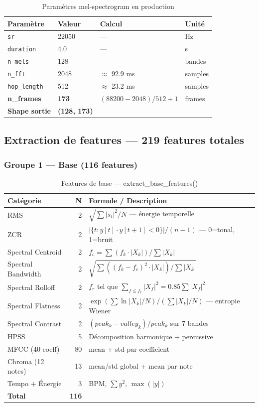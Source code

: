 \documentclass[11pt,a4paper]{article}
\newcommand{\code}[1]{\texttt{\small #1}}
\begin{document}
\begin{table}[htbp]
\centering
\begin{tabular}{@{}llll@{}}
\toprule
\textbf{Paramètre} & \textbf{Valeur} & \textbf{Calcul} & \textbf{Unité} \\
\midrule
\code{sr} & 22050 & — & Hz \\
\code{duration} & 4.0 & — & s \\
\code{n\_mels} & 128 & — & bandes \\
\code{n\_fft} & 2048 & $\approx$ 92.9 ms & samples \\
\code{hop\_length} & 512 & $\approx$ 23.2 ms & samples \\
\textbf{n\_frames} & \textbf{173} & $(88200 - 2048) / 512 + 1$ & frames \\
\textbf{Shape sortie} & \textbf{(128, 173)} & & \\
\bottomrule
\end{tabular}
\caption{Paramètres mel-spectrogram en production}
\end{table}

\subsection{Extraction de features — 219 features totales}

\subsubsection{Groupe 1 — Base (116 features)}

\begin{table}[htbp]
\centering
\begin{tabular}{@{}lrp{8cm}@{}}
\toprule
\textbf{Catégorie} & \textbf{N} & \textbf{Formule / Description} \\
\midrule
RMS & 2 & $\sqrt{\sum|s_t|^2 / N}$ — énergie temporelle \\
ZCR & 2 & $|\{t : y[t] \cdot y[t{+}1] < 0\}| / (n-1)$ — 0=tonal, 1=bruit \\
Spectral Centroid & 2 & $f_c = \sum(f_k \cdot |X_k|) / \sum|X_k|$ \\
Spectral Bandwidth & 2 & $\sqrt{\sum((f_k - f_c)^2 \cdot |X_k|) / \sum|X_k|}$ \\
Spectral Rolloff & 2 & $f_r$ tel que $\sum_{f \leq f_r}|X_f|^2 = 0.85 \sum|X_f|^2$ \\
Spectral Flatness & 2 & $\exp(\sum\ln|X_k|/N) / (\sum|X_k|/N)$ — entropie Wiener \\
Spectral Contrast & 2 & $(peak_k - valley_k)/peak_k$ sur 7 bandes \\
HPSS & 5 & Décomposition harmonique + percussive \\
MFCC (40 coeff) & 80 & mean + std par coefficient \\
Chroma (12 notes) & 13 & mean/std global + mean par note \\
Tempo + Énergie & 3 & BPM, $\sum y^2$, $\max(|y|)$ \\
\midrule
\textbf{Total} & \textbf{116} & \\
\bottomrule
\end{tabular}
\caption{Features de base — extract\_base\_features()}
\end{table}
\end{document}

